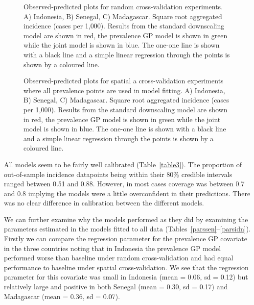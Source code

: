 \documentclass{statsoc}
\begin{document}
\begin{figure}
\caption{\label{randompredobspolyfacet} 
Observed-predicted plots for random cross-validation experiments.
A) Indonesia, B) Senegal, C) Madagascar. Square root aggregated incidence (cases per 1,000).
Results from the standard downscaling model are shown in red, the prevalence GP model is shown in green while the joint model is shown in blue.
The one-one line is shown with a black line and a simple linear regression through the points is shown by a coloured line.
}

\end{figure}




\begin{figure}
\caption{\label{spatial2predobspolyfacet} Observed-predicted plots for spatial a cross-validation experiments where all prevalence points are used in model fitting.
A) Indonesia, B) Senegal, C) Madagascar. Square root aggregated incidence (cases per 1,000).
Results from the standard downscaling model are shown in red, the prevalence GP model is shown in green while the joint model is shown in blue.
The one-one line is shown with a black line and a simple linear regression through the points is shown by a coloured line.
}

\end{figure}




All models seem to be fairly well calibrated (Table~\ref{table3}).
The proportion of out-of-sample incidence datapoints being within their 80\% credible intervals ranged between 0.51 and 0.88.
However, in most cases coverage was between 0.7 and 0.8 implying the models were a little overconfident in their predictions.
There was no clear difference in calibration between the different models.


We can further examine why the models performed as they did by examining the parameters estimated in the models fitted to all data (Tables~\ref{parssen}--\ref{parsidn}).
Firstly we can compare the regression parameter for the prevalence GP covariate in the three countries noting that in Indonesia the prevalence GP model performed worse than baseline under random cross-validation and had equal performance to baseline under spatial cross-validation.
We see that the regression parameter for this covariate was small in Indonesia (mean = 0.06, sd = 0.12) but relatively large and positive in both Senegal (mean = 0.30, sd = 0.17) and Madagascar  (mean = 0.36, sd = 0.07).
\end{document}
